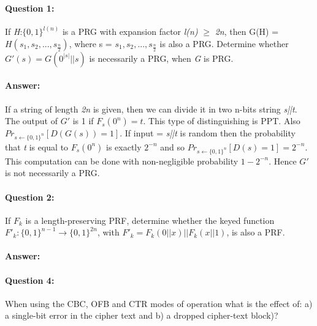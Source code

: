 \documentclass{article}
\begin{document}
    \paragraph{Question 1:} If \emph{H}:$\{0,1\}^{l(n)}$ is a PRG with expansion factor \emph{l(n)} $\geq$ \emph{2n}, then G(H) = $H(s_1,s_2,..., s_{\frac{n}{2}})$, where s = $s_1,s_2,..., s_{\frac{n}{2}}$ is also a PRG. Determine whether $G\prime(s)=G(0^{|s|}||s)$ is necessarily a PRG, when \emph{G} is PRG.
    
    \paragraph{Answer: \newline}
    If a string of length \emph{2n} is given, then we can divide it in two n-bits string \emph{s||t}. The output of $G\prime$ is 1 if ${F_s}(0^n) = t$. This type of distinguishing is PPT. Also $Pr_{s\leftarrow{\{0,1\}^n}}[D(G(s)) = 1]$. If input = \emph{s||t} is random then the probability that \emph{t} is equal to $F_s{(0^n)}$ is exactly $2^{-n}$ and so $Pr_{s\leftarrow{\{0,1\}^n}}[D(s) = 1] = 2^{-n}$. This computation can be done with non-negligible probability ${1-2^{-n}}$. Hence $G\prime$ is not necessarily a PRG.
    
    \paragraph{Question 2:} If $F_k$ is a length-preserving PRF, determine whether the keyed function ${F\prime}_k:{\{0,1\}}^{n-1}\rightarrow{\{0,1\}}^{2n}$, with ${F\prime}_k=F_k(0||x)||F_k(x||1)$, is also a PRF.
    \paragraph{Answer: \newline}
    
    
    \paragraph{Question 4:} When using the CBC, OFB and CTR modes of operation what is the effect of: a) a single-bit error in the cipher text and b) a dropped cipher-text block)?
\end{document}
